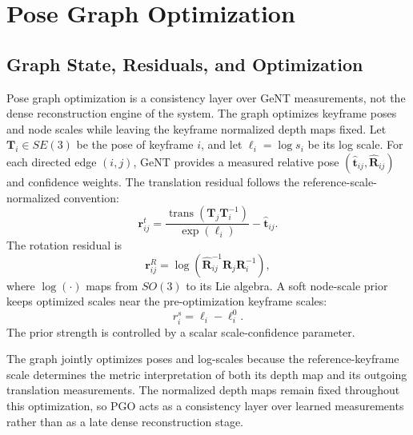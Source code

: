 \section{Pose Graph Optimization}
\label{sec:geont_pgo}

\subsection{Graph State, Residuals, and Optimization}
Pose graph optimization is a consistency layer over GeNT measurements, not the dense reconstruction engine of the system.
The graph optimizes keyframe poses and node scales while leaving the keyframe normalized depth maps fixed.
Let $\bm{T}_i \in SE(3)$ be the pose of keyframe $i$, and let $\ell_i=\log s_i$ be its log scale.
For each directed edge $(i,j)$, GeNT provides a measured relative pose $(\hat{\bm{t}}_{ij},\hat{\bm{R}}_{ij})$ and confidence weights.
The translation residual follows the reference-scale-normalized convention:
\begin{equation}
    \bm{r}^{t}_{ij}
    =
    \frac{\operatorname{trans}(\bm{T}_j\bm{T}_i^{-1})}{\exp(\ell_i)}
    -
    \hat{\bm{t}}_{ij}.
    \label{eq:geont_translation_residual}
\end{equation}
The rotation residual is
\begin{equation}
    \bm{r}^{R}_{ij}
    =
    \log\!\left(
        \hat{\bm{R}}_{ij}^{-1}
        \bm{R}_j
        \bm{R}_i^{-1}
    \right),
    \label{eq:geont_rotation_residual}
\end{equation}
where $\log(\cdot)$ maps from $SO(3)$ to its Lie algebra.
A soft node-scale prior keeps optimized scales near the pre-optimization keyframe scales:
\begin{equation}
    r^s_i = \ell_i - \ell_i^0 .
    \label{eq:geont_scale_prior}
\end{equation}
The prior strength is controlled by a scalar scale-confidence parameter.

The graph jointly optimizes poses and log-scales because the reference-keyframe scale determines the metric interpretation of both its depth map and its outgoing translation measurements.
The normalized depth maps remain fixed throughout this optimization, so PGO acts as a consistency layer over learned measurements rather than as a late dense reconstruction stage.

